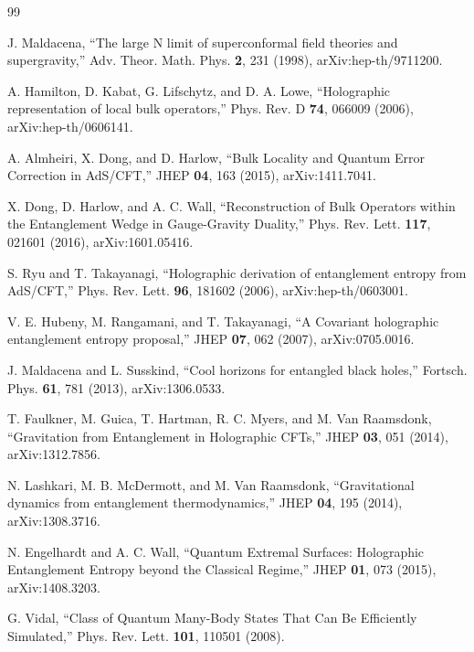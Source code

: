 \documentclass[12pt,a4paper]{article}
\begin{document}
\begin{thebibliography}{99}

J. Maldacena, ``The large N limit of superconformal field theories and supergravity,'' Adv. Theor. Math. Phys. \textbf{2}, 231 (1998), arXiv:hep-th/9711200.

A. Hamilton, D. Kabat, G. Lifschytz, and D. A. Lowe, ``Holographic representation of local bulk operators,'' Phys. Rev. D \textbf{74}, 066009 (2006), arXiv:hep-th/0606141.

A. Almheiri, X. Dong, and D. Harlow, ``Bulk Locality and Quantum Error Correction in AdS/CFT,'' JHEP \textbf{04}, 163 (2015), arXiv:1411.7041.

X. Dong, D. Harlow, and A. C. Wall, ``Reconstruction of Bulk Operators within the Entanglement Wedge in Gauge-Gravity Duality,'' Phys. Rev. Lett. \textbf{117}, 021601 (2016), arXiv:1601.05416.

S. Ryu and T. Takayanagi, ``Holographic derivation of entanglement entropy from AdS/CFT,'' Phys. Rev. Lett. \textbf{96}, 181602 (2006), arXiv:hep-th/0603001.

V. E. Hubeny, M. Rangamani, and T. Takayanagi, ``A Covariant holographic entanglement entropy proposal,'' JHEP \textbf{07}, 062 (2007), arXiv:0705.0016.

J. Maldacena and L. Susskind, ``Cool horizons for entangled black holes,'' Fortsch. Phys. \textbf{61}, 781 (2013), arXiv:1306.0533.

T. Faulkner, M. Guica, T. Hartman, R. C. Myers, and M. Van Raamsdonk, ``Gravitation from Entanglement in Holographic CFTs,'' JHEP \textbf{03}, 051 (2014), arXiv:1312.7856.

N. Lashkari, M. B. McDermott, and M. Van Raamsdonk, ``Gravitational dynamics from entanglement thermodynamics,'' JHEP \textbf{04}, 195 (2014), arXiv:1308.3716.

N. Engelhardt and A. C. Wall, ``Quantum Extremal Surfaces: Holographic Entanglement Entropy beyond the Classical Regime,'' JHEP \textbf{01}, 073 (2015), arXiv:1408.3203.

G. Vidal, ``Class of Quantum Many-Body States That Can Be Efficiently Simulated,'' Phys. Rev. Lett. \textbf{101}, 110501 (2008).


\end{thebibliography}
\end{document}

